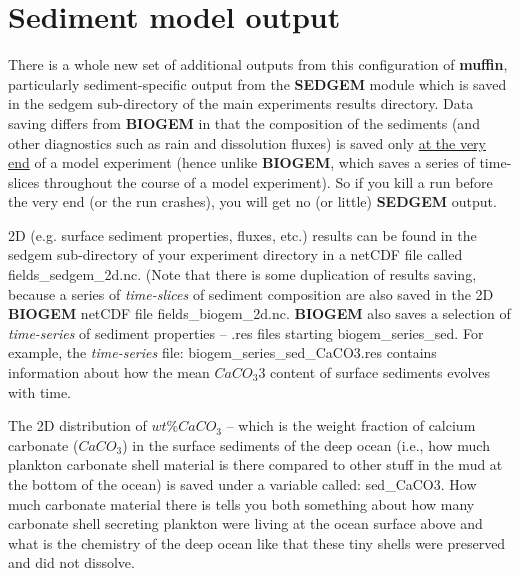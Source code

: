 \documentclass[11pt,fleqn]{book} %
\begin{document}

\newpage


\section{Sediment model output}

There is a whole new set of additional outputs from this configuration of \textbf{muffin}, particularly sediment-specific output from the \textbf{SEDGEM} module which is saved in the \textsf{\footnotesize sedgem } sub-directory of the main experiments results directory. Data saving differs from  \textbf{BIOGEM} in that the composition of the sediments (and other diagnostics such as rain and dissolution fluxes) is saved only \uline{at the very end} of a model experiment (hence unlike \textbf{BIOGEM}, which saves a series of time-slices throughout the course of a model experiment). So if you kill a run before the very end (or the run crashes),  you will get no (or little) \textbf{SEDGEM} output.

2D (e.g. surface sediment properties, fluxes, etc.) results can be found in  the \textsf{\footnotesize sedgem } sub-directory of your experiment directory  in a netCDF file called \textsf{\footnotesize fields\_sedgem\_2d.nc}. (Note that there is some duplication of results saving, because a series of \textit{time-slices} of sediment composition are also saved in the 2D \textbf{BIOGEM} netCDF file \textsf{\footnotesize fields\_biogem\_2d.nc}. \textbf{BIOGEM} also saves a selection of \textit{time-series }of sediment properties -- \textsf{\footnotesize .res } files starting \textsf{\footnotesize biogem\_series\_sed}. For example, the \textit{time-series} file: \textsf{\footnotesize biogem\_series\_sed\_CaCO3.res }  contains information about how the mean \(CaCO_{3}\)3 content of surface sediments evolves with time.

The 2D distribution of \(wt\% CaCO_{3}\) – which is the weight fraction of calcium carbonate (\(CaCO_{3}\)) in the surface sediments of the deep ocean (i.e., how much plankton carbonate shell material is there compared to other stuff in the mud at the bottom of the ocean) is saved under a variable called: \textsf{\footnotesize sed\_CaCO3}. How much carbonate material there is tells you both something about how many carbonate shell secreting plankton were living at the ocean surface above and what is the chemistry of the deep ocean like that these tiny shells were preserved and did not dissolve.
\end{document}
